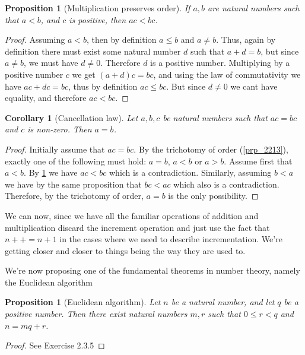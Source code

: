\documentclass[a4paper, twocolumn]{report}
\newcounter{dummy} \numberwithin{dummy}{section}
\newtheorem{prp}[dummy]{Proposition}
\newtheorem{crl}[dummy]{Corollary}
\theoremstyle{definition}
\theoremstyle{solution}
\newcommand{\dplus}{{+}{+}} %
\begin{document}
\begin{prp}[Multiplication preserves order]
  \label{prp_236}
  If $a, b$ are natural numbers such that $a < b$, and $c$ is positive, then
  $ac < bc$. 
\end{prp}
\begin{proof}
  Assuming $a < b$, then by definition $a \leq b$ and $a \neq b$.  Thus, again
  by definition there must exist some natural number $d$ such that $a + d = b$,
  but since $a \neq b$, we must have $d \neq 0$. Therefore $d$ is a positive
  number.  Multiplying by a positive number $c$ we get $(a + d)c = bc$, and
  using the law of commutativity we have $ac + dc = bc$, thus by definition $ac
  \leq bc$. But since $d \neq 0$ we cant have equality, and therefore $ac <
  bc$. 
\end{proof}

\begin{crl}[Cancellation law]
  \label{crl_237}
  Let $a, b, c$ be natural numbers such that $ac = bc$ and $c$ is non-zero.
  Then $a = b$. 
\end{crl}
\begin{proof}
  Initially assume that $ac = bc$.  By the trichotomy of order (\ref{prp_2213}), exactly one of
  the following must hold: $a = b$, $a < b$ or $a > b$.  Assume first that $a <
  b$. By \ref{prp_236} we have $ac < bc$ which is a contradiction.  Similarly,
  assuming $b < a$ we have by the same proposition that $bc < ac$ which also is
  a contradiction.  Therefore, by the trichotomy of order, $a = b$ is the only
  possibility. 
\end{proof}

We can now, since we have all the familiar operations of addition and
multiplication discard the increment operation and just use the fact that
$n\dplus = n+1$ in the cases where we need to describe incrementation.  We're
getting closer and closer to things being the way they are used to.

We're now proposing one of the fundamental theorems in number theory, namely the Euclidean algorithm

\addtocounter{dummy}{1}
\begin{prp}[Euclidean algorithm]
  \label{prp_239}
  Let $n$ be a natural number, and let $q$ be a positive number. Then there
  exist natural numbers $m, r$ such that $0 \leq r < q$ and $n = mq + r$. 
\end{prp}
\begin{proof}
  See Exercise 2.3.5
\end{proof}
\end{document}
